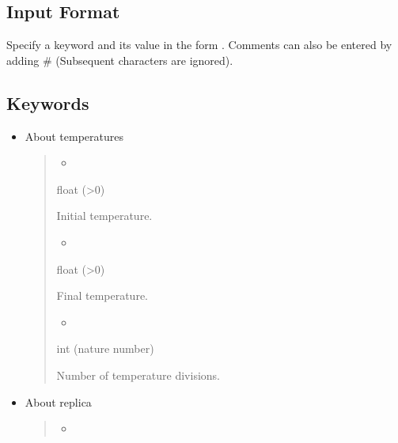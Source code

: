 \documentclass[letterpaper,10pt,english]{sphinxmanual}
\begin{document}
\subsection{Input Format}
\label{\detokenize{file_specification/parameter_replica:input-format}}
Specify a keyword and its value in the form .
Comments can also be entered by adding \# (Subsequent characters are ignored).


\subsection{Keywords}
\label{\detokenize{file_specification/parameter_replica:keywords}}\begin{itemize}
\item {} 
About temperatures
\begin{quote}
\begin{itemize}
\item {} 

\end{itemize}

 float (\textgreater{}0)

Initial temperature.
\begin{itemize}
\item {} 

\end{itemize}

 float (\textgreater{}0)

Final temperature.
\begin{itemize}
\item {} 

\end{itemize}

 int (nature number)

 Number of temperature divisions.
\end{quote}

\item {} 
About replica
\begin{quote}
\begin{itemize}
\item {} 

\end{itemize}


\end{quote}
\end{itemize}
\end{document}
